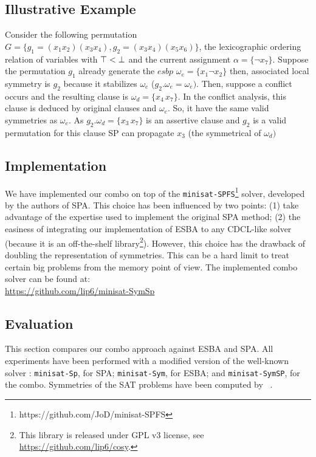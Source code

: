 \subsection{Illustrative Example}

Consider the following permutation $G = \{ g_1 = (x_1 x_2) (x_3 x_4)  , g_2 = (x_3 x_4) (x_5 x_6) \}$,
the lexicographic ordering relation of variables with $\top < \bot$ and 
the current assignment $\alpha = \{\neg x_7 \}$.
Suppose the permutation $g_1$ already generate the $esbp$ $\omega_e = \{ x_1 \neg x_2\}$ then, associated local symmetry is 
$g_2$ because it stabilizes $\omega_e$ ($g_2.\omega_e = \omega_e)$. Then, suppose a conflict occurs and the resulting clause is
$\omega_d = \{x_4\, x_7\}$. In the conflict analysis, this clause is deduced by original clauses and $\omega_e$.
 So, it have the same valid symmetries as $\omega_e$. As $g_2.\omega_d = \{x_3\, x_7\}$ is an assertive clause and $g_2$ is a valid 
 permutation for this clause SP can propagate $x_3$ (the symmetrical of $\omega_d)$



\subsection{Implementation}
We have implemented our combo on top of the
\texttt{minisat-SPFS}\footnote{https://github.com/JoD/minisat-SPFS} solver,
developed by the authors of SPA.
This choice has been influenced by two points: (1) take advantage of the
expertise used to implement the original SPA method; (2) the easiness of
integrating our implementation of ESBA to any CDCL-like solver (because it is an
off-the-shelf library\footnote{This library is released under GPL v3 license,
see \url{https://github.com/lip6/cosy}.}).
However, this choice has the drawback of doubling the representation of
symmetries. This can be a hard limit to treat certain big problems from the
memory point of view.
The implemented combo solver can be found at:\\
\mbox{\url{https://github.com/lip6/minisat-SymSp}}
\subsection{Evaluation}
This section compares our combo approach against ESBA and SPA. All experiments
have been performed with a modified version of the well-known \minisat{} solver \cite{een2003extensible}: \texttt{minisat-Sp}, for
SPA; \texttt{minisat-Sym}, for ESBA; and \texttt{minisat-SymSP}, for the
combo. Symmetries of the SAT problems have been computed by
\bliss{}~\cite{JunttilaKaski:ALENEX2007}.

